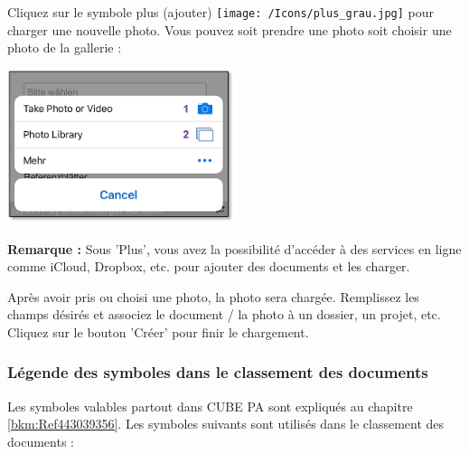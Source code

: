 Cliquez sur le symbole plus (ajouter) \texttt{[image: /Icons/plus\_grau.jpg]} pour charger une nouvelle photo. Vous pouvez soit prendre une photo soit choisir une photo de la gallerie :

\vspace{\baselineskip}

\hspace{15mm} \includegraphics[height=45mm]{../chapters/11_Dokumentenablage/pictures/11-mob09_Foto_aufnehmen.jpg}

\vspace{\baselineskip}

\textbf{Remarque :} Sous 'Plus', vous avez la possibilité d'accéder à des services en ligne comme iCloud, Dropbox, etc. pour ajouter des documents et les charger.

\vspace{\baselineskip}

Après avoir pris ou choisi une photo, la photo sera chargée. Remplissez les champs désirés et associez le document / la photo à un dossier, un projet, etc. Cliquez sur le bouton 'Créer' pour finir le chargement.



\pagebreak

\subsubsection{Légende des symboles dans le classement des documents}

Les symboles valables partout dans CUBE PA sont expliqués au chapitre \ref{bkm:Ref443039356}. Les symboles suivants sont utilisés dans le classement des documents :

